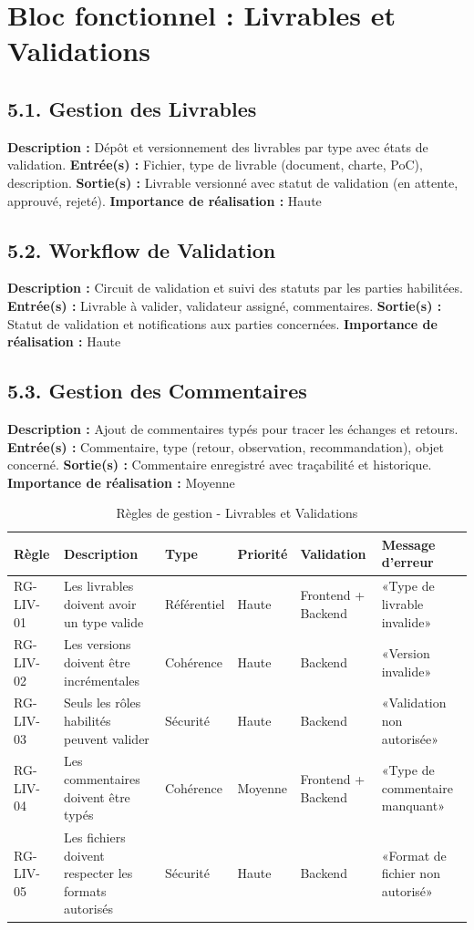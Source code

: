 \section{Bloc fonctionnel : Livrables et Validations}

\subsection{5.1. Gestion des Livrables}
\textbf{Description :} Dépôt et versionnement des livrables par type avec états de validation.
\textbf{Entrée(s) :} Fichier, type de livrable (document, charte, PoC), description.
\textbf{Sortie(s) :} Livrable versionné avec statut de validation (en attente, approuvé, rejeté).
\textbf{Importance de réalisation :} Haute

\subsection{5.2. Workflow de Validation}
\textbf{Description :} Circuit de validation et suivi des statuts par les parties habilitées.
\textbf{Entrée(s) :} Livrable à valider, validateur assigné, commentaires.
\textbf{Sortie(s) :} Statut de validation et notifications aux parties concernées.
\textbf{Importance de réalisation :} Haute

\subsection{5.3. Gestion des Commentaires}
\textbf{Description :} Ajout de commentaires typés pour tracer les échanges et retours.
\textbf{Entrée(s) :} Commentaire, type (retour, observation, recommandation), objet concerné.
\textbf{Sortie(s) :} Commentaire enregistré avec traçabilité et historique.
\textbf{Importance de réalisation :} Moyenne

\begin{table}[H]
\centering
\footnotesize
\begin{tabular}{|p{1.5cm}|p{3.5cm}|p{1.5cm}|p{1.5cm}|p{2cm}|p{2.5cm}|}
\hline
\textbf{Règle} & \textbf{Description} & \textbf{Type} & \textbf{Priorité} & \textbf{Validation} & \textbf{Message d'erreur} \\
\hline
RG-LIV-01 & Les livrables doivent avoir un type valide & Référentiel & Haute & Frontend + Backend & «Type de livrable invalide» \\
\hline
RG-LIV-02 & Les versions doivent être incrémentales & Cohérence & Haute & Backend & «Version invalide» \\
\hline
RG-LIV-03 & Seuls les rôles habilités peuvent valider & Sécurité & Haute & Backend & «Validation non autorisée» \\
\hline
RG-LIV-04 & Les commentaires doivent être typés & Cohérence & Moyenne & Frontend + Backend & «Type de commentaire manquant» \\
\hline
RG-LIV-05 & Les fichiers doivent respecter les formats autorisés & Sécurité & Haute & Backend & «Format de fichier non autorisé» \\
\hline
\end{tabular}
\caption{Règles de gestion - Livrables et Validations}
\label{tab:rg_livrables}
\end{table}

